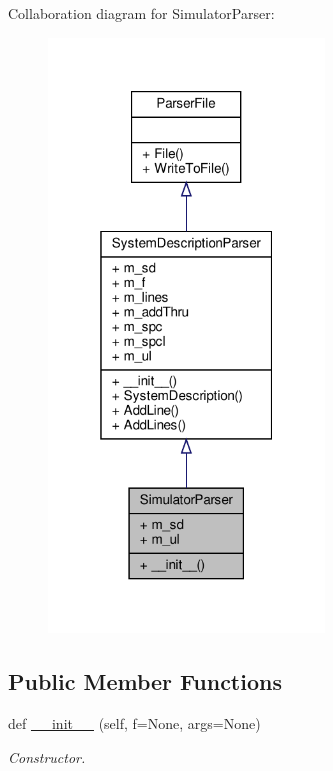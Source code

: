 Collaboration diagram for Simulator\+Parser\+:
\nopagebreak
\begin{figure}[H]
\begin{center}
\leavevmode
\includegraphics[width=208pt]{classSignalIntegrity_1_1Parsers_1_1SimulatorParser_1_1SimulatorParser__coll__graph}
\end{center}
\end{figure}
\subsection*{Public Member Functions}
\begin{DoxyCompactItemize}
\item 
def \hyperlink{classSignalIntegrity_1_1Parsers_1_1SimulatorParser_1_1SimulatorParser_af9856388f7022892c3159ad55872a27e}{\+\_\+\+\_\+init\+\_\+\+\_\+} (self, f=None, args=None)
\begin{DoxyCompactList}\small\item\em Constructor. \end{DoxyCompactList}\end{DoxyCompactItemize}


